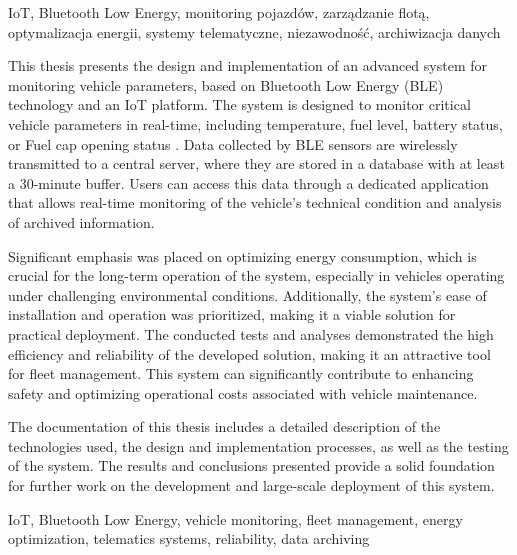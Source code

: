 \documentclass[
    bindingoffset=5mm,  %
    footnoteindent=3mm, %
    hyphenation=true    %
]{src/wut-thesis}
\begin{document}
\begin{keywords}
IoT, Bluetooth Low Energy, monitoring pojazdów, zarządzanie flotą, optymalizacja energii, 
systemy telematyczne, niezawodność, archiwizacja danych
\end{keywords}
\clearpage
\begin{secondabstract}
This thesis presents the design and implementation of an advanced system for monitoring 
vehicle parameters, based on Bluetooth Low Energy (BLE) technology and an IoT platform. 
The system is designed to monitor critical vehicle parameters in real-time, including 
temperature, fuel level, battery status, or Fuel cap opening status . Data collected by BLE sensors 
are wirelessly transmitted to a central server, where they are stored in a database with 
at least a 30-minute buffer. Users can access this data through a dedicated application 
that allows real-time monitoring of the vehicle's technical condition and analysis of archived information.

Significant emphasis was placed on optimizing energy consumption, which is crucial for the 
long-term operation of the system, especially in vehicles operating under challenging environmental conditions. 
Additionally, the system's ease of installation and operation was prioritized, making it a viable 
solution for practical deployment. The conducted tests and analyses demonstrated the high efficiency 
and reliability of the developed solution, making it an attractive tool for fleet management. 
This system can significantly contribute to enhancing safety and optimizing operational costs 
associated with vehicle maintenance.

The documentation of this thesis includes a detailed description of the technologies used, 
the design and implementation processes, as well as the testing of the system. The results 
and conclusions presented provide a solid foundation for further work on the development and 
large-scale deployment of this system.
\end{secondabstract}

\begin{secondkeywords}
IoT, Bluetooth Low Energy, vehicle monitoring, fleet management, energy optimization, 
telematics systems, reliability, data archiving
\end{secondkeywords}

\pagestyle{plain}
\end{document}

